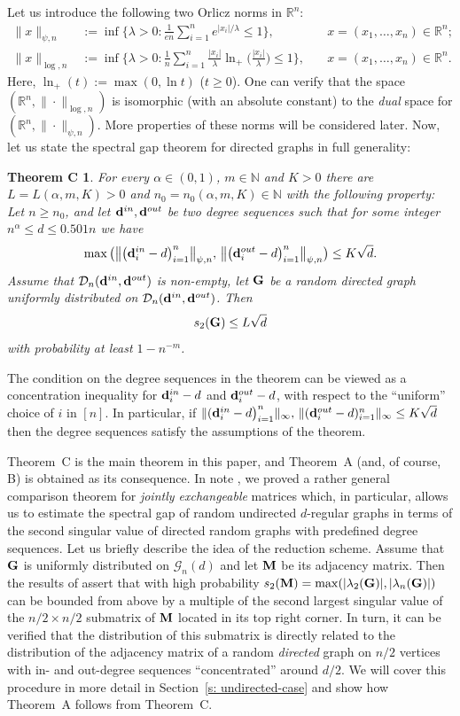 \documentclass[12pt]{article}
\newtheorem*{theoremC*}{Theorem C}
\theoremstyle{definition}
\theoremstyle{plain}
\newcommand{\N}{\mathbb{N}}
\newcommand{\R}{\mathbb{R}}
\def\rangr{{\bf{}G}}
\def\ranmtx{{\bf{}M}}
\def\InDeg{{\bf d}^{in}}
\def\OutDeg{{\bf d}^{out}}
\def\DGraphSet{{\mathcal D}_n}
\def\UGraphSet{{\mathcal G}_{n}}
\begin{document}
Let us introduce the following two Orlicz norms in $\R^n$:
\begin{align}\label{eq: psi definition}
\|x\|_{\psi,n}&:=\inf\Big\{\lambda>0: \frac{1}{en}\sum_{i=1}^n e^{|x_i|/\lambda}\leq 1\Big\},\quad &x=(x_1,\ldots,x_n)\in\R^n;\\
\label{eq: log norm definition}
\|x\|_{\log,n}&:=\inf\Big\{\lambda>0:
\frac{1}{n}\sum_{i=1}^n \frac{|x_i|}{\lambda}\ln_+\Big(\frac{|x_i|}{\lambda}\Big)\leq 1\Big\},\quad &x=(x_1,\ldots,x_n)\in\R^n.
\end{align}
Here, $\ln_+(t):=\max(0,\ln t)$ ($t\geq 0$).
One can verify that the space $(\R^n,\|\cdot\|_{\log,n})$ is isomorphic (with an absolute constant) to the {\it dual} space
for $(\R^n,\|\cdot\|_{\psi,n})$. More properties of these norms will be considered later.
Now, let us state the spectral gap theorem for directed graphs in full generality:
\begin{theoremC*}
For every $\alpha\in(0,1)$, $m\in\N$ and $K>0$
there are $L=L(\alpha,m,K)>0$ and $n_0=n_0(\alpha,m,K)\in\N$ with the following property:
Let $n\geq n_0$,
and let $\InDeg, \OutDeg$ be two degree sequences
such that for some integer $n^\alpha\leq d\leq 0.501n$
we have
$$\max\big(\big\|\big(\InDeg_i-d\big)_{i=1}^n\big\|_{\psi,n},\,\big\|\big(\OutDeg_i-d\big)_{i=1}^n\big\|_{\psi,n}\big)\leq K\sqrt{d}.$$
Assume that $\DGraphSet(\InDeg,\OutDeg)$ is non-empty,
let $\rangr$ be a random directed graph uniformly distributed on
$\DGraphSet(\InDeg, \OutDeg)$. Then
$$s_2(\rangr)\leq L\sqrt{d}$$
with probability at least $1-n^{-m}$.
\end{theoremC*}
The condition on the degree sequences in the theorem can be viewed as a concentration inequality for $\InDeg_i-d$ and
$\OutDeg_i-d$, with respect to the ``uniform'' choice of $i$ in $[n]$.
In particular, if $\|(\InDeg_i-d\big)_{i=1}^n\|_{\infty},\,\|(\OutDeg_i-d)_{i=1}^n\|_{\infty}\leq K\sqrt{d}$
then the degree sequences satisfy the assumptions of the theorem.

Theorem~C is the main theorem in this paper, and Theorem~A (and, of course, B) is obtained
as its consequence. In note \cite{TY_short}, 
we proved a rather general comparison theorem for {\it jointly exchangeable}
matrices which, in particular, 
allows us to estimate the spectral gap of random undirected 
$d$-regular graphs in terms of the second singular value 
of directed random graphs with predefined degree sequences. 
Let us briefly describe the idea of the reduction scheme. Assume that $\rangr$
is uniformly distributed on $\UGraphSet(d)$ and let $\ranmtx$ be its adjacency matrix.
Then the results of \cite{TY_short} assert that with high probability
$s_2(\ranmtx)=\max(|\lambda_2(\rangr)|,|\lambda_n(\rangr)|)$
can be bounded from above by a multiple of
the second largest singular value of the
$n/2\times n/2$ submatrix of $\ranmtx$ located in its top right corner.
In turn, it can be verified that the distribution of this submatrix
is directly related to the distribution of the adjacency matrix
of a random {\it directed} graph on $n/2$ vertices with in- and out-degree
sequences ``concentrated'' around $d/2$.
We will cover this procedure in more detail in Section~\ref{s: undirected-case} and show how Theorem~A follows from Theorem~C.
\end{document}
